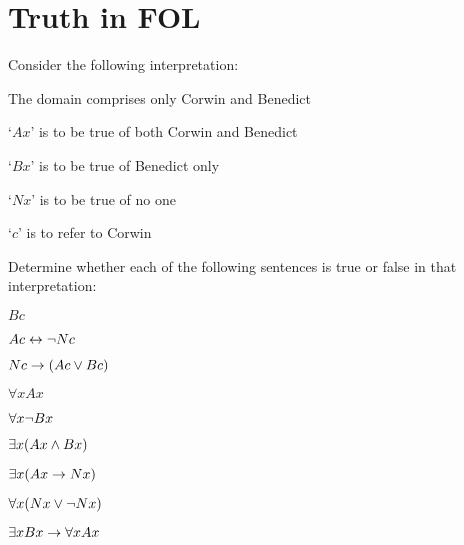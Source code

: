 
\setcounter{chapter}{27}
\chapter{Truth in FOL}\setcounter{ProbPart}{0}
\problempart
\label{pr.TorF1}
Consider the following interpretation:
	\begin{ebullet}
		\item The domain comprises only Corwin and Benedict
		\item `$Ax$' is to be true of both Corwin and Benedict
		\item `$Bx$' is to be true of Benedict only
		\item `$Nx$' is to be true of no one
		\item `$c$' is to refer to Corwin
	\end{ebullet}
Determine whether each of the following sentences is true or false in that interpretation:
\begin{earg}
\item $Bc$ \hfill {}
\item $Ac \leftrightarrow \neg Nc$ \hfill {}
\item $Nc \rightarrow (Ac \vee Bc)$ \hfill {}
\item $\forall x Ax$ \hfill {}
\item $\forall x \neg Bx$ \hfill {}
\item $\exists x(Ax \wedge Bx)$ \hfill {}
\item $\exists x(Ax \rightarrow Nx)$ \hfill {}
\item $\forall x(Nx \vee \neg Nx)$ \hfill {}
\item $\exists x Bx \rightarrow \forall x Ax$ \hfill {}
\end{earg}

